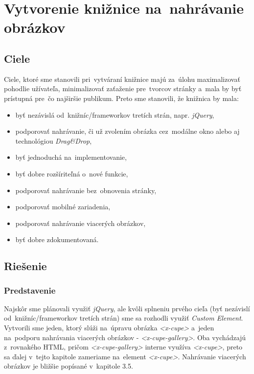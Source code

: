 \chapter{Vytvorenie knižnice na~nahrávanie obrázkov}
\label{sec:solution}

\section{Ciele}
\label{sec:goals}

Ciele, ktoré sme stanovili pri~vytváraní knižnice majú za~úlohu maximalizovať pohodlie užívateľa, minimalizovať zaťaženie pre~tvorcov stránky a~mala by byť prístupná pre~čo najširšie publikum. Preto sme stanovili, že knižnica by mala:

\begin{itemize}
	\item byť nezávislá od~knižníc/frameworkov tretích strán, napr. \emph{jQuery},
	\item podporovať nahrávanie, či už zvolením obrázka cez~modálne okno alebo aj technológiou \emph{Drag\&Drop}, 
	\item byť jednoduchá na~implementovanie,
	\item byť dobre rozšíriteľná o~nové funkcie,
	\item podporovať nahrávanie bez~obnovenia stránky,
	\item podporovať mobilné zariadenia,
	\item podporovať nahrávanie viacerých obrázkov,
	\item byť dobre zdokumentovaná.
\end{itemize}


\section{Riešenie}
\subsection{Predstavenie}
\label{sec:predstavenie-riesenia}
Najskôr sme plánovali využiť \emph{jQuery}, ale kvôli splneniu prvého cieľa (byť nezávislí od~knižníc/frameworkov tretích strán) sme sa rozhodli využiť \emph{Custom Element}. Vytvorili sme jeden, ktorý slúži na~úpravu obrázka \emph{<x-cupe>} a~jeden na~podporu nahrávania viacerých obrázkov - \emph{<x-cupe-gallery>}. Oba vychádzajú z~rovnakého HTML, pričom \emph{<x-cupe-gallery>} interne využíva \emph{<x-cupe>}, preto sa ďalej v~tejto kapitole zameriame na~element \emph{<x-cupe>}. Nahrávanie viacerých obrázkov je bližšie popísané v~kapitole 3.5.



